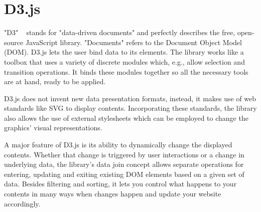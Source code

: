 \section{D3.js}
"D3" ~\cite{d3js_what_is_d3} stands for "data-driven documents" and perfectly describes the free, open-source JavaScript library. "Documents" refers to the Document Object Model (DOM). D3.js lets the user bind data to its elements. The library works like a toolbox that uses a variety of discrete modules which, e.g., allow selection and transition operations. It binds these modules together so all the necessary tools are at hand, ready to be applied.

D3.js does not invent new data presentation formats, instead, it makes use of web standards like SVG to display contents. Incorporating these standards, the library also allows the use of external stylesheets which can be employed to change the graphics' visual representations.

A major feature of D3.js is its ability to dynamically change the displayed contents. Whether that change is triggered by user interactions or a change in underlying data, the library's data join concept allows separate operations for entering, updating and exiting existing DOM elements based on a given set of data. Besides filtering and sorting, it lets you control what happens to your contents in many ways when changes happen and update your website accordingly. 